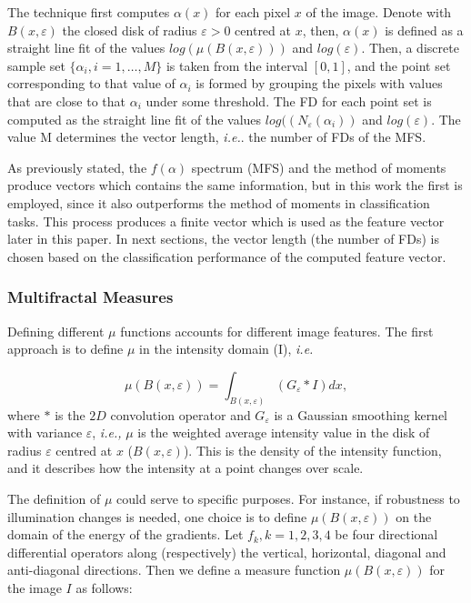 The technique first computes $\alpha(x)$ for each pixel $x$ of the image. Denote with $B(x,\varepsilon)$ the closed disk of radius $\varepsilon > 0$ centred at $x$, then, $\alpha(x)$ is defined as a straight line fit of the values $log(\mu(B(x,\varepsilon)))$ and $log(\varepsilon)$. Then, a discrete sample set $\{\alpha_{i}, i = 1,\dots,M\}$ is taken from the interval $[0,1]$, and the point set corresponding to that value of $\alpha_{i}$ is formed by grouping the pixels with values that are close to that $\alpha_{i}$ under some threshold. The FD for each point set is computed as the straight line fit of the values $log((N_{\varepsilon}(\alpha_{i}))$ and $log(\varepsilon)$. The value M determines the vector length, {\em i.e.}. the number of FDs of the MFS.


As previously stated, the $f(\alpha)$ spectrum (MFS) and the method of moments produce vectors which contains the same information, but in this work the first is employed, since it also outperforms the method of moments in classification tasks. This process produces a finite vector which is used as the feature vector later in this paper. In next sections, the vector length (the number of FDs) is chosen based on the classification performance of the computed feature vector.


\subsubsection{Multifractal Measures}
\label{sec:mfsmeasures}
Defining different $\mu$ functions accounts for different image features. The first approach is to define $\mu$ in the intensity domain (I), {\em i.e.}

\begin{equation}
\mu(B(x,\varepsilon)) = \int_{B(x,\varepsilon)}{(G_{\varepsilon} \ast I)} dx,
\label{eqn:eqn11}
\end{equation}
where $\ast$ is the $2D$ convolution operator and $G_{\varepsilon}$ is a Gaussian smoothing kernel with variance $\varepsilon$, {\em i.e., } $\mu$ is the weighted average intensity value in the disk of radius $\varepsilon$ centred at $x$ ($B(x,\varepsilon)$). This is the density of the intensity function, and it describes how the intensity at a point changes over scale.

The definition of $\mu$ could serve to specific purposes. For instance, if robustness to illumination changes is needed, one choice is to define $\mu(B(x,\varepsilon))$ on the domain of the energy of the gradients. Let ${ f_{k} , k = 1, 2, 3, 4}$ be four directional differential operators along (respectively) the vertical, horizontal, diagonal and anti-dia\-gonal directions. Then we define a measure function $\mu(B(x,\varepsilon))$ for the image $I$ as follows:

